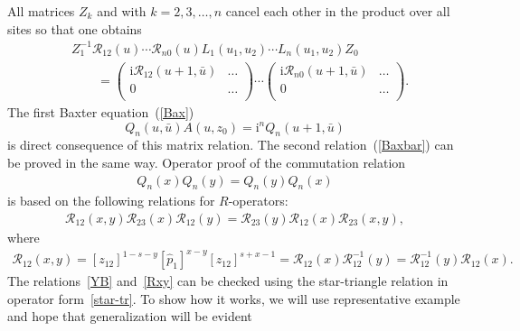 \documentclass[pdftex]{sigma}
\renewcommand{\imath}{\mathrm{i}}
\numberwithin{equation}{section}
\begin{document}
All matrices $Z_k$ and  with $k=2,3,\dots,n$ cancel
each other in the product over all sites so that one obtains
\begin{align*}
&
Z_1^{-1} \mathcal{R}_{12}( u)\cdots
\mathcal{R}_{n0}( u)
L_1(u_1 ,u_2)\cdots L_n(u_1 ,u_2) Z_0 \\
&
\qquad{} =
\begin{pmatrix}
\imath\mathcal{R}_{12}(u+1,\bar{u}) & \dots \\
 0 & \dots \\
\end{pmatrix}
\cdots
\begin{pmatrix}
\imath\mathcal{R}_{n0}(u+1,\bar{u}) & \dots \\
 0 & \dots \\
\end{pmatrix} .
\end{align*}
The first Baxter equation~(\ref{Bax})
\begin{equation*}
Q_n(u,\bar{u}) A(u ,z_0) = \imath^n Q_n(u+1,\bar{u})
\end{equation*}
is direct consequence of this matrix relation.
The second relation~(\ref{Baxbar}) can be proved in the same way.
Operator proof of the commutation relation
\begin{align}\label{com}
Q_n( x) Q_n( y) = Q_n(y) Q_n(x)
\end{align}
is based on the following relations for $R$-operators:
\begin{align}\label{YB}
\mathcal{R}_{12}(x,y) \mathcal{R}_{23}(x) \mathcal{R}_{12}(y) =
\mathcal{R}_{23}(y) \mathcal{R}_{12}(x) \mathcal{R}_{23}(x,y) ,
\end{align}
where
\begin{align}\label{Rxy}
\mathcal{R}_{12}(x,y) = [z_{12}]^{1-s-y} [\hat{p}_1]^{x-y} [z_{12}]^{s+x-1} = \mathcal{R}_{12}(x) \mathcal{R}^{-1}_{12}(y) =
\mathcal{R}^{-1}_{12}(y) \mathcal{R}_{12}(x) .
\end{align}
The relations~\eqref{YB} and~\eqref{Rxy} can be checked using the
star-triangle relation in operator form~\eqref{star-tr}.
To show how it works, we will use representative example
and hope that generalization will be evident
\end{document}
